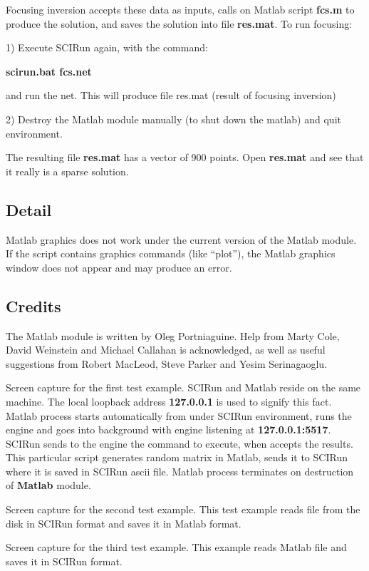 Focusing inversion accepts these data as inputs, calls
on Matlab script {\bf fcs.m} to produce the solution,
and saves the solution into file {\bf res.mat}.
To run focusing:

1) Execute SCIRun again, with the command:

   {\bf scirun.bat fcs.net}

   and run the net. This will produce file
   res.mat (result of focusing inversion)

2) Destroy the Matlab module manually
   (to shut down the matlab)
   and quit \sr{} environment.

The resulting file {\bf res.mat} 
has  a vector of 900 points. 
Open {\bf res.mat}
and see that it really is a
sparse solution.


\subsection{Detail} \indent

Matlab graphics does not work under the current version of the Matlab module.
If the script contains graphics commands (like ``plot''), the 
Matlab graphics window does not appear and may produce an error.

\subsection{Credits} \indent

The Matlab module is written by Oleg Portniaguine. Help
from Marty Cole, David Weinstein  and Michael Callahan 
is acknowledged, as well as useful suggestions from Robert 
MacLeod, Steve Parker and Yesim Serinagaoglu. 

{
Screen capture for the first test example. SCIRun and Matlab reside on
the same machine. The local loopback address {\bf 127.0.0.1} is used
to signify this fact. Matlab process starts automatically from under SCIRun
environment, runs the engine and goes into background with engine listening
at {\bf 127.0.0.1:5517}. SCIRun sends to the engine the command
to execute, when accepts the results. This particular script generates
random matrix in Matlab, sends it to SCIRun where it is saved in SCIRun
ascii file. Matlab process terminates on destruction
of {\bf Matlab} module.
}

{
Screen capture for the second test example. This test example reads
file from the disk in SCIRun format and saves it in Matlab format.
}

{
Screen capture for the third test example. This example reads
Matlab file and saves it in SCIRun format.
} 




